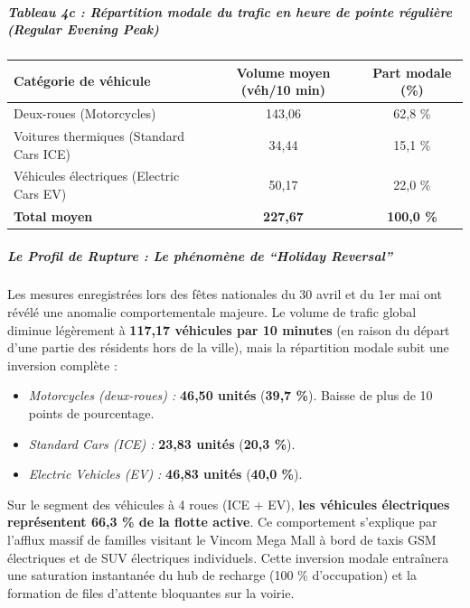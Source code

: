 \documentclass[10pt, a4paper]{article}
\newcounter{none}
\providecommand{\tightlist}{}
\begin{document}
\subparagraph{Tableau 4c : Répartition modale du trafic en heure de
pointe régulière (Regular Evening
Peak)}\label{tableau-4c-ruxe9partition-modale-du-trafic-en-heure-de-pointe-ruxe9guliuxe8re-regular-evening-peak}

{\def\LTcaptype{none} %
\begin{longtable}[]{@{}lcc@{}}
\toprule\noalign{}
Catégorie de véhicule & Volume moyen (véh/10 min) & Part modale (\%) \\
\midrule\noalign{}
\endhead
\bottomrule\noalign{}
\endlastfoot
Deux-roues (Motorcycles) & 143,06 & 62,8 \% \\
Voitures thermiques (Standard Cars ICE) & 34,44 & 15,1 \% \\
Véhicules électriques (Electric Cars EV) & 50,17 & 22,0 \% \\
\textbf{Total moyen} & \textbf{227,67} & \textbf{100,0 \%} \\
\end{longtable}
}

\subparagraph{Le Profil de Rupture : Le phénomène de ``Holiday
Reversal''}\label{le-profil-de-rupture-le-phuxe9nomuxe8ne-de-holiday-reversal}

Les mesures enregistrées lors des fêtes nationales du 30 avril et du 1er
mai ont révélé une anomalie comportementale majeure. Le volume de trafic
global diminue légèrement à \textbf{117,17 véhicules par 10 minutes} (en
raison du départ d'une partie des résidents hors de la ville), mais la
répartition modale subit une inversion complète :

\begin{itemize}
\tightlist
\item
  \emph{Motorcycles (deux-roues) :} \textbf{46,50 unités} (\textbf{39,7
  \%}). Baisse de plus de 10 points de pourcentage.
\item
  \emph{Standard Cars (ICE) :} \textbf{23,83 unités} (\textbf{20,3 \%}).
\item
  \emph{Electric Vehicles (EV) :} \textbf{46,83 unités} (\textbf{40,0
  \%}).
\end{itemize}

Sur le segment des véhicules à 4 roues (ICE + EV), \textbf{les véhicules
électriques représentent 66,3 \% de la flotte active}. Ce comportement
s'explique par l'afflux massif de familles visitant le Vincom Mega Mall
à bord de taxis GSM électriques et de SUV électriques individuels. Cette
inversion modale entraînera une saturation instantanée du hub de
recharge (100 \% d'occupation) et la formation de files d'attente
bloquantes sur la voirie.
\end{document}
